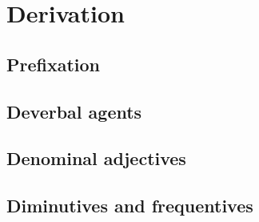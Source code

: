 \chapter{Derivation}
\label{derivation}

\section{Prefixation}

\section{Deverbal agents}

\section{Denominal adjectives}

\section{Diminutives and frequentives}
